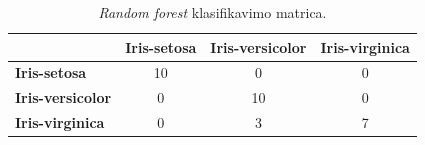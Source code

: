 \begin{table}[H]
    \centering
    \caption{\textit{Random forest} klasifikavimo matrica.}
    \begin{tabular}{|l|c|c|c|}
        \hline
        & \textbf{Iris-setosa} & \textbf{Iris-versicolor} & \textbf{Iris-virginica} \\
        \hline
        \textbf{Iris-setosa} & 10 & 0 & 0 \\ \hline
        \textbf{Iris-versicolor} & 0 & 10 & 0 \\ \hline
        \textbf{Iris-virginica} & 0 & 3 & 7 \\ \hline
    \end{tabular}
    \label{tab:random_forest_klasifikavimo_matrica}
\end{table}